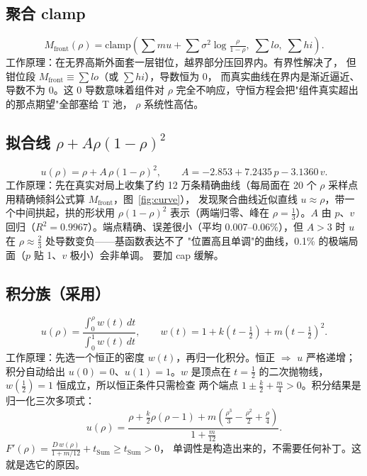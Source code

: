 \documentclass[UTF8,10pt]{ctexart}
\begin{document}
\subsection{聚合 clamp}
\begin{equation}
M_{\text{front}}(\rho) = \mathrm{clamp}\!\left(\sum mu + \sum\sigma^2
\log\tfrac{\rho}{1-\rho},\; \sum lo,\; \sum hi\right).
\end{equation}
工作原理：在无界高斯外面套一层钳位，越界部分压回界内。有界性解决了，
但钳位段 $M_{\text{front}}\equiv\sum lo$（或 $\sum hi$），导数恒为 0，
而真实曲线在界内是渐近逼近、导数不为 0。这 0 导数意味着组件对 $\rho$
完全不响应，守恒方程会把"组件真实超出的那点期望"全部塞给 T 池，
$\rho$ 系统性高估。

\subsection{拟合线 $\rho + A\rho(1-\rho)^2$}
\begin{equation}
u(\rho) = \rho + A\,\rho(1-\rho)^2, \qquad
A = -2.853 + 7.2435\,p - 3.1360\,v .
\end{equation}
工作原理：先在真实对局上收集了约 12 万条精确曲线（每局面在 20 个
$\rho$ 采样点用精确倾斜公式算 $M_{\text{front}}$，图~\ref{fig:curve}），
发现聚合曲线近似直线 $u\approx\rho$，带一个中间拱起，拱的形状用
$\rho(1-\rho)^2$ 表示（两端归零、峰在 $\rho=\frac13$）。$A$ 由 $p$、$v$
回归（$R^2=0.9967$）。端点精确、误差很小（平均 0.007--0.06\%），但
$A>3$ 时 $u$ 在 $\rho\approx\frac23$ 处导数变负——基函数表达不了
"位置高且单调"的曲线，0.1\% 的极端局面（$p$ 贴 1、$v$ 极小）会非单调。
要加 cap 缓解。

\subsection{积分族（采用）}
\begin{equation}
u(\rho) = \frac{\int_0^\rho w(t)\,dt}{\int_0^1 w(t)\,dt}, \qquad
w(t) = 1 + k\left(t-\tfrac12\right) + m\left(t-\tfrac12\right)^2 .
\end{equation}
工作原理：先选一个恒正的密度 $w(t)$，再归一化积分。恒正 $\Rightarrow$
$u$ 严格递增；积分自动给出 $u(0)=0$、$u(1)=1$。$w$ 是顶点在
$t=\frac12$ 的二次抛物线，$w(\frac12)=1$ 恒成立，所以恒正条件只需检查
两个端点 $1\pm\frac{k}{2}+\frac{m}{4}>0$。积分结果是归一化三次多项式：
\begin{equation}\label{eq:u}
u(\rho) =
\frac{\rho + \frac{k}{2}\rho(\rho-1)
      + m\left(\frac{\rho^3}{3}-\frac{\rho^2}{2}+\frac{\rho}{4}\right)}
     {1 + \frac{m}{12}} .
\end{equation}
$F'(\rho) = \frac{D\,w(\rho)}{1+m/12} + t_{\text{Sum}} \ge t_{\text{Sum}} > 0$，
单调性是构造出来的，不需要任何补丁。这就是选它的原因。
\end{document}
